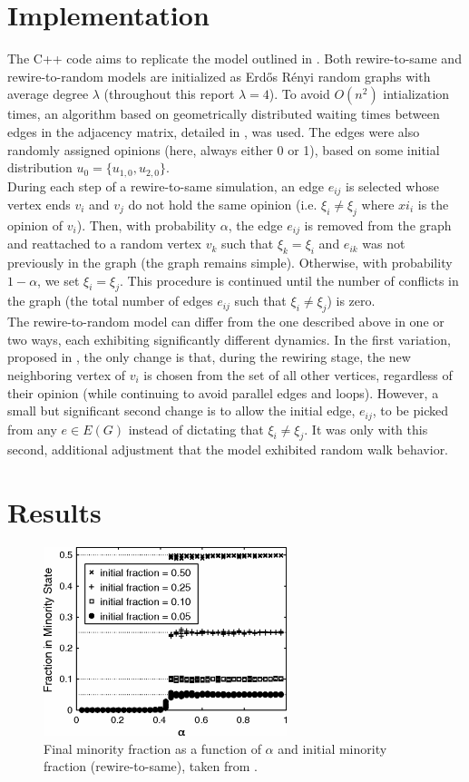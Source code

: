 \documentclass[11pt]{article}
\begin{document}
\section*{Implementation}
The C++ code aims to replicate the model outlined in \cite{durret:pnas12}. Both rewire-to-same and rewire-to-random models are initialized as Erd\H{o}s R\'{e}nyi random graphs with average degree $\lambda$ (throughout this report $\lambda = 4$). To avoid $O(n^{2})$ intialization times, an algorithm based on geometrically distributed waiting times between edges in the adjacency matrix, detailed in \cite{?}, was used. The edges were also randomly assigned opinions (here, always either 0 or 1), based on some initial distribution $u_{0}=\{u_{1,0},u_{2,0}\}$. \\[1pt]
\indent During each step of a rewire-to-same simulation, an edge $e_{ij}$ is selected whose vertex ends $v_{i}$ and $v_{j}$ do not hold the same opinion (i.e. $\xi_{i}\neq\xi_{j}$ where $xi_{i}$ is the opinion of $v_{i}$). Then, with probability $\alpha$, the edge $e_{ij}$ is removed from the graph and reattached to a random vertex $v_{k}$ such that $\xi_{k}=\xi_{i}$ and $e_{ik}$ was not previously in the graph (the graph remains simple). Otherwise, with probability $1-\alpha$, we set $\xi_{i}=\xi_{j}$. This procedure is continued until the number of conflicts in the graph (the total number of edges $e_{ij}$ such that $\xi_{i}\neq\xi_{j}$) is zero. \\[1pt]
\indent The rewire-to-random model can differ from the one described above in one or two ways, each exhibiting significantly different dynamics. In the first variation, proposed in \cite{durret:pnas12}, the only change is that, during the rewiring stage, the new neighboring vertex of $v_{i}$ is chosen from the set of all other vertices, regardless of their opinion (while continuing to avoid parallel edges and loops). However, a small but significant second change is to allow the initial edge, $e_{ij}$, to be picked from any $e\in E(G)$ instead of dictating that $\xi_{i}\neq\xi_{j}$.  It was only with this second, additional adjustment that the model exhibited random walk behavior.
\section*{Results}

\begin{figure}[h!]
  \centering
  \includegraphics[height=55mm]{rwToSameBifDiag}
  \caption{Final minority fraction as a function of $\alpha$ and initial minority fraction (rewire-to-same), taken from \cite{durret:pnas12}.}
  \label{fig:durretRWtoSameBD}
\end{figure}
\end{document}
